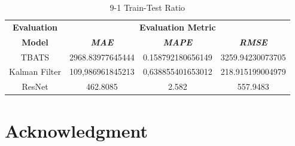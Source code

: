 \documentclass[conference]{IEEEtran}
\begin{document}
\begin{table}[htbp]
\caption{9-1 Train-Test Ratio}
\begin{center}
\begin{tabular}{|c|c|c|c|}
\hline
\textbf{Evaluation}&\multicolumn{3}{|c|}{\textbf{Evaluation Metric}} \\
\cline{2-4} 
\textbf{Model} & \textbf{\textit{MAE}}& \textbf{\textit{MAPE}}& \textbf{\textit{RMSE}} \\
\hline
TBATS & 2968.83977645444 & 0.158792180656149 & 3259.94230073705\\
\hline
Kalman Filter & 109,986961845213 & 0,638855401653012 & 218.915199004979\\
\hline
ResNet & 462.8085 & 2.582 & 557.9483\\
\hline
\end{tabular}
\label{tab1}
\end{center}
\end{table}

\newpage

\section*{Acknowledgment}

\end{document}
